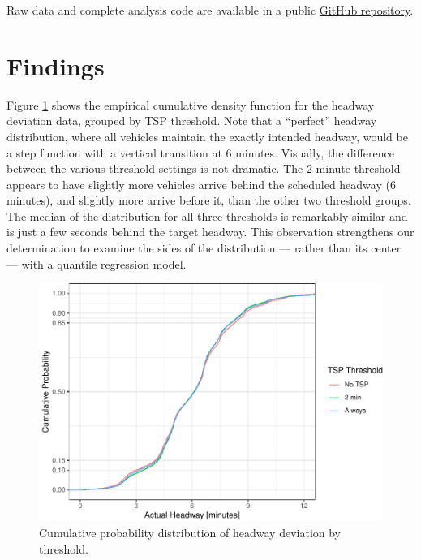 \documentclass[3p, authoryear, review]{elsarticle} %
\begin{document}
Raw data and complete analysis code are available in a public
\href{https://github.com/byu-transpolab/uvx_headways}{GitHub repository}.

\hypertarget{findings}{%
\section{Findings}\label{findings}}

Figure \ref{fig:ecdf} shows the empirical cumulative density function for the
headway deviation data, grouped by TSP threshold. Note that a ``perfect''
headway distribution, where all vehicles maintain the exactly intended headway,
would be a step function with a vertical transition at 6 minutes.
Visually, the difference between the various threshold settings is not dramatic.
The 2-minute threshold appears to have slightly more vehicles arrive behind the
scheduled headway (6 minutes), and slightly more arrive before it, than the
other two threshold groups. The median of the distribution for all
three thresholds is remarkably similar and is just a few seconds behind the target
headway. This observation strengthens our determination to examine the sides of
the distribution --- rather than its center --- with a quantile regression model.

\begin{figure}
\centering
\includegraphics{uvx_headways_files/figure-latex/ecdf-1.pdf}
\caption{\label{fig:ecdf}Cumulative probability distribution of headway deviation by threshold.}
\end{figure}
\end{document}
